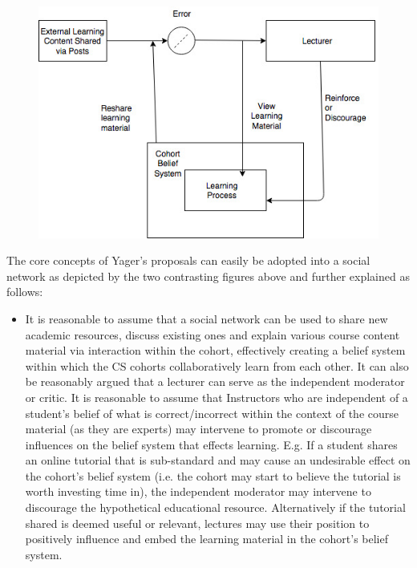 \begin{itemize}[\null]
\begin{figure}[H]
	\centering
	\includegraphics[scale=0.5]{chapters/chapter02/figures/useCase.jpg}
	\label{fig:Relationship Between Learning Process,Belief System and Critic}
\end{figure}

    The core concepts of Yager's proposals can easily be adopted into a social network as depicted by the two contrasting figures above and further explained as follows:
    \begin{itemize}
        \item It is reasonable to assume that a social network can be used to share new academic resources, discuss existing ones and explain various course content material via interaction within the cohort, effectively creating a belief system within which the CS cohorts collaboratively learn from each other. It can also be reasonably argued that a lecturer can serve as the independent moderator or critic. It is reasonable to assume that Instructors who are independent of a student's belief of what is correct/incorrect within the context of the course material (as they are experts) may intervene to promote or discourage influences on the belief system that effects learning. E.g. If a student shares an online tutorial that is sub-standard and may cause an undesirable effect on the cohort's belief system (i.e. the cohort may start to believe the tutorial is worth investing time in), the independent moderator may intervene to discourage the hypothetical educational resource. Alternatively if the tutorial shared is deemed useful or relevant, lectures may use their position to positively influence and embed the learning material in the cohort's belief system.
        

\end{itemize}
\end{itemize}

